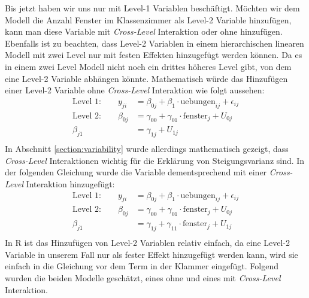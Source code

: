 \documentclass[12pt]{article}\usepackage[]{graphicx}\usepackage[]{color}
\begin{document}
Bis jetzt haben wir uns nur mit Level-1 Variablen beschäftigt. Möchten wir dem Modell die Anzahl Fenster im Klassenzimmer als Level-2 Variable hinzufügen, kann man diese Variable mit \textit{Cross-Level} Interaktion oder ohne hinzufügen. Ebenfalls ist zu beachten, dass Level-2 Variablen in einem hierarchischen linearen Modell mit zwei Level nur mit festen Effekten hinzugefügt werden können. Da es in einem zwei Level Modell nicht noch ein drittes höheres Level gibt, von dem eine Level-2 Variable abhängen könnte. Mathematisch würde das Hinzufügen einer Level-2 Variable ohne \textit{Cross-Level} Interaktion wie folgt aussehen:
\begin{equation} 
\begin{split}	
 \text{Level 1:}  \qquad y_{ji} & = \beta_{0j} + \beta_{1} \cdot \text{uebungen}_{ij} + \epsilon_{ij}\\
 \text{Level 2:} \qquad \beta_{0j} & = \gamma_{00} + \gamma_{01} \cdot \text{fenster}_{j} + U_{0j}\\
 \beta_{j1} & = \gamma_{1j} + U_{1j}\\
\end{split}	
\end{equation} 
In Abschnitt \ref{section:variability} wurde allerdings mathematisch gezeigt, dass \textit{Cross-Level} Interaktionen wichtig für die Erklärung von Steigungsvarianz sind. In der folgenden Gleichung wurde die Variable dementsprechend mit einer \textit{Cross-Level} Interaktion hinzugefügt:
\begin{equation} 
\begin{split}	
 \text{Level 1:}  \qquad y_{ji} & = \beta_{0j} + \beta_{1} \cdot \text{uebungen}_{ij} + \epsilon_{ij}\\
 \text{Level 2:} \qquad \beta_{0j} & = \gamma_{00} + \gamma_{01} \cdot \text{fenster}_{j} + U_{0j}\\
 \beta_{j1} & = \gamma_{1j} + \gamma_{11} \cdot \text{fenster}_{j} + U_{1j}\\
\end{split}	
\end{equation} 
In R ist das Hinzufügen von Level-2 Variablen relativ einfach, da eine Level-2 Variable in unserem Fall nur als fester Effekt hinzugefügt werden kann, wird sie einfach in die Gleichung vor dem Term in der Klammer eingefügt. Folgend wurden die beiden Modelle geschätzt, eines ohne und eines mit \textit{Cross-Level} Interaktion.
\end{document}
